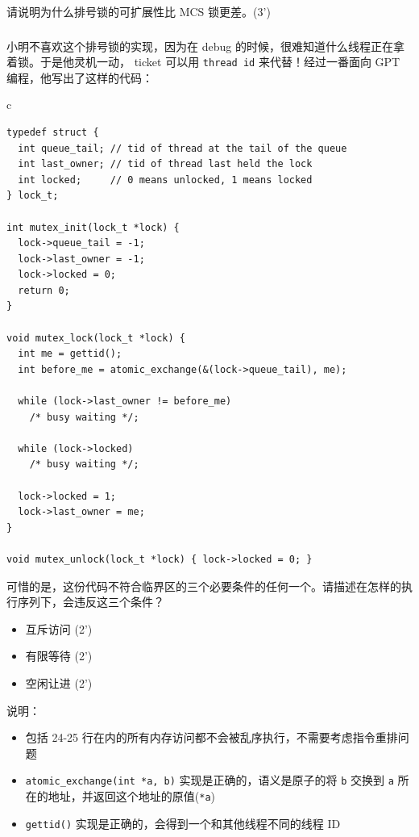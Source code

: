 \documentclass[a4paper,12pt]{article}
\newcommand{\score}[1]{(#1')}
\begin{document}
请说明为什么排号锁的可扩展性比 MCS 锁更差。\score{3}

\begin{answer}
  \lipsum[3]
\end{answer}

\subsubsection{}

小明不喜欢这个排号锁的实现，因为在 debug 的时候，很难知道什么线程正在拿着锁。于是他灵机一动， ticket 可以用 \verb|thread id| 来代替！经过一番面向 GPT 编程，他写出了这样的代码：

\begin{table}[htb]
  \centering
  \begin{tabular}{c}
    \begin{lstlisting}
typedef struct {
  int queue_tail; // tid of thread at the tail of the queue
  int last_owner; // tid of thread last held the lock
  int locked;     // 0 means unlocked, 1 means locked
} lock_t;

int mutex_init(lock_t *lock) {
  lock->queue_tail = -1;
  lock->last_owner = -1;
  lock->locked = 0;
  return 0;
}

void mutex_lock(lock_t *lock) {
  int me = gettid();
  int before_me = atomic_exchange(&(lock->queue_tail), me);

  while (lock->last_owner != before_me)
    /* busy waiting */;

  while (lock->locked)
    /* busy waiting */;

  lock->locked = 1;
  lock->last_owner = me;
}

void mutex_unlock(lock_t *lock) { lock->locked = 0; }
    \end{lstlisting}
  \end{tabular}
\end{table}

可惜的是，这份代码不符合临界区的三个必要条件的任何一个。请描述在怎样的执行序列下，会违反这三个条件？

\begin{itemize}
  \item 互斥访问 \score{2}
  \item 有限等待 \score{2}
  \item 空闲让进 \score{2}
\end{itemize}

说明：

\begin{itemize}
  \item 包括 24-25 行在内的所有内存访问都不会被乱序执行，不需要考虑指令重排问题
  \item \verb|atomic_exchange(int *a, b)| 实现是正确的，语义是原子的将 \verb|b| 交换到 \verb|a| 所在的地址，并返回这个地址的原值(\verb|*a|)
  \item \verb|gettid()| 实现是正确的，会得到一个和其他线程不同的线程 ID
\end{itemize}
\end{document}

